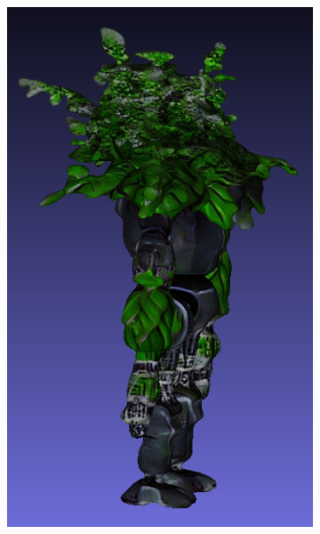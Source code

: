 \begin{figure}[H]
\begin{subfigure}[b]{0.26\textwidth}
        \caption{}
    \end{subfigure}
    \begin{subfigure}[b]{0.16\textwidth}
        \centering
        \includegraphics[width=\textwidth]{figures/future/plantRobot_fine_side.png}
        \caption{}
    \end{subfigure}
    \begin{subfigure}[b]{0.27\textwidth}
        \centering

\end{subfigure}
\end{figure}
